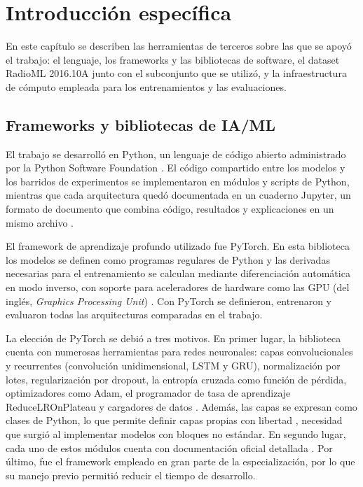 
\chapter{Introducción específica}

\label{Chapter2}

En este capítulo se describen las herramientas de terceros sobre las que se apoyó el trabajo: el lenguaje, los frameworks y las bibliotecas de software, el dataset RadioML 2016.10A junto con el subconjunto que se utilizó, y la infraestructura de cómputo empleada para los entrenamientos y las evaluaciones.


\section{Frameworks y bibliotecas de IA/ML}
\label{sec:frameworks}

El trabajo se desarrolló en Python, un lenguaje de código abierto administrado por la Python Software Foundation \cite{python2026about}. El código compartido entre los modelos y los barridos de experimentos se implementaron en módulos y scripts de Python, mientras que cada arquitectura quedó documentada en un cuaderno Jupyter, un formato de documento que combina código, resultados y explicaciones en un mismo archivo \cite{kluyver2016jupyter}.

El framework de aprendizaje profundo utilizado fue PyTorch. En esta biblioteca los modelos se definen como programas regulares de Python y las derivadas necesarias para el entrenamiento se calculan mediante diferenciación automática en modo inverso, con soporte para aceleradores de hardware como las GPU (del inglés, \textit{Graphics Processing Unit}) \cite{paszke2019pytorch}. Con PyTorch se definieron, entrenaron y evaluaron todas las arquitecturas comparadas en el trabajo.

La elección de PyTorch se debió a tres motivos. En primer lugar, la biblioteca cuenta con numerosas herramientas para redes neuronales: capas convolucionales y recurrentes (convolución unidimensional, LSTM y GRU), normalización por lotes, regularización por dropout, la entropía cruzada como función de pérdida, optimizadores como Adam, el programador de tasa de aprendizaje ReduceLROnPlateau y cargadores de datos \cite{pytorch2026docs}. Además, las capas se expresan como clases de Python, lo que permite definir capas propias con libertad \cite{paszke2019pytorch}, necesidad que surgió al implementar modelos con bloques no estándar. En segundo lugar, cada uno de estos módulos cuenta con documentación oficial detallada \cite{pytorch2026docs}. Por último, fue el framework empleado en gran parte de la especialización, por lo que su manejo previo permitió reducir el tiempo de desarrollo.

